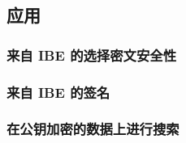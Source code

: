 \subsection{应用}\label{subsec:15-6-4}

\subsubsection{来自 IBE 的选择密文安全性}\label{subsubsec:15-6-4-1}

\begin{theorem}\label{theo:15-8}
	
\end{theorem}

\subsubsection{来自 IBE 的签名}\label{subsubsec:15-6-4-2}

\begin{theorem}\label{theo:15-9}
	
\end{theorem}

\subsubsection{在公钥加密的数据上进行搜索}\label{subsubsec:15-6-4-3}
